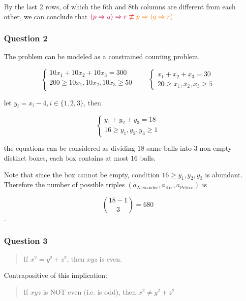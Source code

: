 \documentclass[
]{article}
\begin{document}
By the last 2 rows, of which the 6th and 8th columns are different from
each other, we can conclude that
\(\color{purple}(p\Rightarrow q)\Rightarrow r\color{red} \not\equiv \color{orange}p\Rightarrow(q\Rightarrow r)\)

\hypertarget{question-2}{%
\subsubsection{Question 2}\label{question-2}}

The problem can be modeled as a constrained counting problem.

$$\left\{\begin{array}{l}10x_1+10x_2+10x_3=300\\
200\geqslant 10x_1,10x_2,10x_3\geqslant 50\\
\end{array}\right.\qquad \left\{\begin{array}{l}x_1+x_2+x_3=30\\
20\geqslant x_1,x_2,x_3\geqslant 5\end{array}\right.$$

let $y_i=x_i-4,i\in\{1,2,3\}$, then 

$$\left\{\begin{array}{l}y_1+y_2+y_3=18\\
16\geqslant y_1,y_2,y_3\geqslant 1\end{array}\right.$$

the equations can be considered as dividing $18$ same balls into $3$ non-empty distinct boxes, each box contains at most $16$ balls. 

Note that since the box cannot be empty, condition $16\geqslant y_1,y_2,y_3$ is abundant. Therefore the number of possible triples $(a_{\text{Alexander}},a_{\text{Kik}},a_{\text{Petros}})$ is

$$\displaystyle \binom{18-1}{3}=680$$.

\hypertarget{question-3}{%
\subsubsection{Question 3}\label{question-3}}

\begin{quote}
If \(x^2=y^2+z^2\), then \(xyz\) is even.
\end{quote}

Contrapositive of this implication:

\begin{quote}
If \(xyz\) is NOT even (i.e. is odd), then \(x^2\neq y^2+z^2\)
\end{quote}
\end{document}
